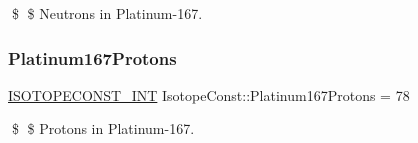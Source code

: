 \$ \$ Neutrons in Platinum-\/167. \mbox{\label{group___isotope_const-_platinum-_pt167_gaa7ec7103993faff9350166cf46934172}} 
\subsubsection{\texorpdfstring{Platinum167\+Protons}{Platinum167Protons}}
{\footnotesize\ttfamily \mbox{\hyperlink{group___isotope_const-_macros_ga5f18360b3e99483a35c32d789e62621c}{I\+S\+O\+T\+O\+P\+E\+C\+O\+N\+S\+T\+\_\+\+I\+NT}} Isotope\+Const\+::\+Platinum167\+Protons = 78}

\$ \$ Protons in Platinum-\/167. 